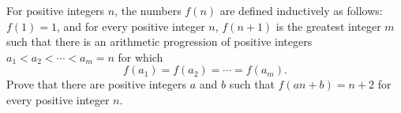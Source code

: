 For positive integers $n$, the numbers $f(n)$ are defined inductively as follows: $f(1) = 1$, and for every positive integer $n$, $f(n+1)$ is the greatest integer $m$ such that there is an arithmetic progression of positive integers $a_1 < a_2 < \cdots < a_m = n$ for which
\[ f(a_1) = f(a_2) = \cdots = f(a_m). \]
Prove that there are positive integers $a$ and $b$ such that $f(an+b) = n+2$ for every positive integer $n$.

